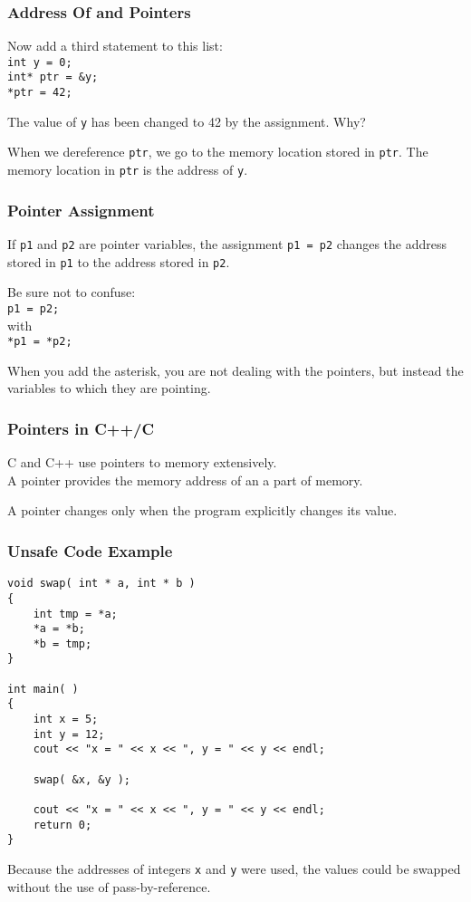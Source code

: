 \begin{frame}
\frametitle{Address Of and Pointers}

Now add a third statement to this list:\\
\texttt{int y = 0;\\
int* ptr = \&y;\\
*ptr = 42;}

The value of \texttt{y} has been changed to 42 by the assignment. Why?

When we dereference \texttt{ptr}, we go to the memory location stored in \texttt{ptr}. The memory location in \texttt{ptr} is the address of \texttt{y}.

\end{frame}

\begin{frame}
\frametitle{Pointer Assignment}
If \texttt{p1} and \texttt{p2} are pointer variables, the assignment \texttt{p1 = p2} changes the address stored in \texttt{p1} to the address stored in \texttt{p2}.

Be sure not to confuse:\\
\texttt{p1 = p2;}\\
with \\
\texttt{*p1 = *p2;}

When you add the asterisk, you are not dealing with the pointers, but instead the variables to which they are pointing.

\end{frame}




\begin{frame}
\frametitle{Pointers in C++/C}



C and C++ use pointers to memory extensively.\\
\quad A pointer provides the memory address of an a part of memory.

A pointer changes only when the program explicitly changes its value.

\end{frame}

\begin{frame}[fragile]
\frametitle{Unsafe Code Example}

{\scriptsize
\begin{verbatim}
void swap( int * a, int * b )
{
    int tmp = *a;
    *a = *b;
    *b = tmp;
}

int main( )
{
    int x = 5;
    int y = 12;
    cout << "x = " << x << ", y = " << y << endl;
	
    swap( &x, &y );

    cout << "x = " << x << ", y = " << y << endl;
    return 0;
}
\end{verbatim}
}

Because the addresses of integers \texttt{x} and \texttt{y} were used, the values could be swapped without the use of pass-by-reference.

\end{frame}



